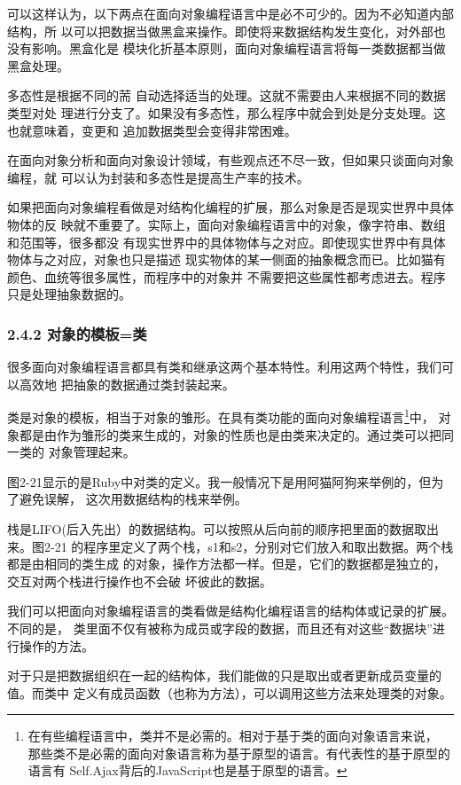 \documentclass[11pt]{ctexart}
\begin{document}
可以这样认为，以下两点在面向对象编程语言中是必不可少的。因为不必知道内部结构，所
以可以把数据当做黑盒来操作。即使将来数据结构发生变化，对外部也没有影响。黑盒化是
模块化折基本原则，面向对象编程语言将每一类数据都当做黑盒处理。

多态性是根据不同的荋 自动选择适当的处理。这就不需要由人来根据不同的数据类型对处
理进行分支了。如果没有多态性，那么程序中就会到处是分支处理。这也就意味着，变更和
追加数据类型会变得非常困难。

在面向对象分析和面向对象设计领域，有些观点还不尽一致，但如果只谈面向对象编程，就
可以认为封装和多态性是提高生产率的技术。

如果把面向对象编程看做是对结构化编程的扩展，那么对象是否是现实世界中具体物体的反
映就不重要了。实际上，面向对象编程语言中的对象，像字符串、数组和范围等，很多都没
有现实世界中的具体物体与之对应。即使现实世界中有具体物体与之对应，对象也只是描述
现实物体的某一侧面的抽象概念而已。比如猫有颜色、血统等很多属性，而程序中的对象并
不需要把这些属性都考虑进去。程序只是处理抽象数据的。
\subsubsection{2.4.2 对象的模板=类}
\label{sec:org21cfa01}

很多面向对象编程语言都具有类和继承这两个基本特性。利用这两个特性，我们可以高效地
把抽象的数据通过类封装起来。

类是对象的模板，相当于对象的雏形。在具有类功能的面向对象编程语言\footnote{在有些编程语言中，类并不是必需的。相对于基于类的面向对象语言来说，
那些类不是必需的面向对象语言称为基于原型的语言。有代表性的基于原型的语言有
Self.Ajax背后的JavaScript也是基于原型的语言。}中，
对象都是由作为雏形的类来生成的，对象的性质也是由类来决定的。通过类可以把同一类的
对象管理起来。

图2-21显示的是Ruby中对类的定义。我一般情况下是用阿猫阿狗来举例的，但为了避免误解，
这次用数据结构的栈来举例。

栈是LIFO(后入先出）的数据结构。可以按照从后向前的顺序把里面的数据取出来。图2-21
的程序里定义了两个栈，s1和s2，分别对它们放入和取出数据。两个栈都是由相同的类生成
的对象，操作方法都一样。但是，它们的数据都是独立的，交互对两个栈进行操作也不会破
坏彼此的数据。

我们可以把面向对象编程语言的类看做是结构化编程语言的结构体或记录的扩展。不同的是，
类里面不仅有被称为成员或字段的数据，而且还有对这些“数据块”进行操作的方法。

对于只是把数据组织在一起的结构体，我们能做的只是取出或者更新成员变量的值。而类中
定义有成员函数（也称为方法），可以调用这些方法来处理类的对象。
\end{document}
